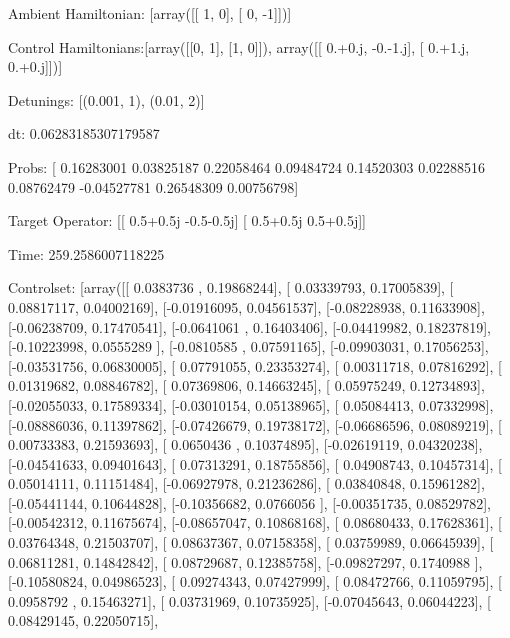 \documentclass{article}
\begin{document}
    

\newpage

Ambient Hamiltonian: [array([[ 1,  0],
       [ 0, -1]])]

Control Hamiltonians:[array([[0, 1],
       [1, 0]]), array([[ 0.+0.j, -0.-1.j],
       [ 0.+1.j,  0.+0.j]])]

Detunings: [(0.001, 1), (0.01, 2)]

 dt: 0.06283185307179587

Probs: [ 0.16283001  0.03825187  0.22058464  0.09484724  0.14520303  0.02288516
  0.08762479 -0.04527781  0.26548309  0.00756798]

Target Operator: [[ 0.5+0.5j -0.5-0.5j]
 [ 0.5+0.5j  0.5+0.5j]]

Time: 259.2586007118225

Controlset: [array([[ 0.0383736 ,  0.19868244],
       [ 0.03339793,  0.17005839],
       [ 0.08817117,  0.04002169],
       [-0.01916095,  0.04561537],
       [-0.08228938,  0.11633908],
       [-0.06238709,  0.17470541],
       [-0.0641061 ,  0.16403406],
       [-0.04419982,  0.18237819],
       [-0.10223998,  0.0555289 ],
       [-0.0810585 ,  0.07591165],
       [-0.09903031,  0.17056253],
       [-0.03531756,  0.06830005],
       [ 0.07791055,  0.23353274],
       [ 0.00311718,  0.07816292],
       [ 0.01319682,  0.08846782],
       [ 0.07369806,  0.14663245],
       [ 0.05975249,  0.12734893],
       [-0.02055033,  0.17589334],
       [-0.03010154,  0.05138965],
       [ 0.05084413,  0.07332998],
       [-0.08886036,  0.11397862],
       [-0.07426679,  0.19738172],
       [-0.06686596,  0.08089219],
       [ 0.00733383,  0.21593693],
       [ 0.0650436 ,  0.10374895],
       [-0.02619119,  0.04320238],
       [-0.04541633,  0.09401643],
       [ 0.07313291,  0.18755856],
       [ 0.04908743,  0.10457314],
       [ 0.05014111,  0.11151484],
       [-0.06927978,  0.21236286],
       [ 0.03840848,  0.15961282],
       [-0.05441144,  0.10644828],
       [-0.10356682,  0.0766056 ],
       [-0.00351735,  0.08529782],
       [-0.00542312,  0.11675674],
       [-0.08657047,  0.10868168],
       [ 0.08680433,  0.17628361],
       [ 0.03764348,  0.21503707],
       [ 0.08637367,  0.07158358],
       [ 0.03759989,  0.06645939],
       [ 0.06811281,  0.14842842],
       [ 0.08729687,  0.12385758],
       [-0.09827297,  0.1740988 ],
       [-0.10580824,  0.04986523],
       [ 0.09274343,  0.07427999],
       [ 0.08472766,  0.11059795],
       [ 0.0958792 ,  0.15463271],
       [ 0.03731969,  0.10735925],
       [-0.07045643,  0.06044223],
       [ 0.08429145,  0.22050715],
\end{document}
